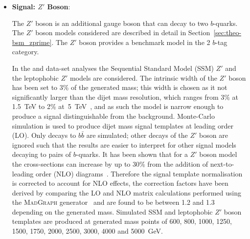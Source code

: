 \begin{itemize}[leftmargin=*]
\item\textbf{Signal: $Z'$ Boson}:  

  \vspace{0.5em}
  The $Z'$ boson is an additional gauge boson that can decay to two $b$-quarks.
  The $Z'$ boson models considered are
  described in detail in Section~\ref{sec:theo-bsm_zprime}.
  The $Z'$ boson provides a benchmark model in the 2 $b$-tag category. \vspace{1em}

  In the \summer{} and \lm{} data-set analyses
  the Sequential Standard Model (SSM) $Z'$ and the leptophobic $Z'$ models are considered.
  The intrinsic width of the $Z'$ boson has been set to 3\% of the generated mass;
  this width is chosen as it not significantly larger than the dijet mass resolution,
  which ranges from 3\% at 1.5~TeV to 2\% at~5~TeV~\cite{dijet-mori16_paper},
  and as such the model is narrow enough to produce a signal distinguishable from the background.
  Monte-Carlo simulation is used to produce dijet mass signal templates at leading order (LO).
  Only decays to $b\bar{b}$ are simulated;
  other decays of the  $Z'$ boson are ignored such that the
  results are easier to interpret for other signal models decaying to pairs of $b$-quarks.
  It has been shown that for a $Z'$ boson model the cross-sections can increase by up to 30\%
  from the addition of next-to-leading order (NLO) diagrams~\cite{evt-NLO_zprime}.
  Therefore the signal template normalisation is corrected to account for NLO effects,
  the correction factors have been derived by comparing
  the LO and NLO matrix calculations performed using the \textsc{MadGraph} generator~\cite{dibjet-madGraph}
  and are found to be between 1.2 and 1.3 depending on the generated mass.
  Simulated SSM and leptophobic $Z'$ boson templates are produced at generated mass points of
  600, 800, 1000, 1250, 1500, 1750, 2000, 2500, 3000, 4000 and 5000~GeV.  \vspace{1em}
  

\end{itemize}
